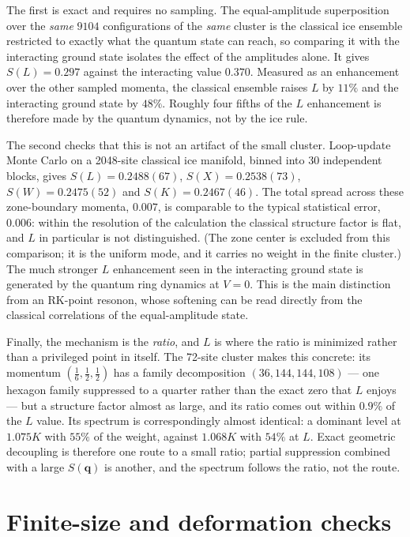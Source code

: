 \documentclass[aps,prl,twocolumn,amsmath,amssymb,superscriptaddress,
longbibliography,floatfix]{revtex4-2}
\newcommand{\bq}{\bm q}
\begin{document}
The first is exact and requires no sampling. The equal-amplitude
superposition over the \emph{same} $9104$ configurations of the
\emph{same} cluster is the classical ice ensemble restricted to
exactly what the quantum state can reach, so comparing it with the
interacting ground state isolates the effect of the amplitudes alone.
It gives $S(L)=0.297$ against the interacting value $0.370$. Measured
as an enhancement over the other sampled momenta, the classical
ensemble raises $L$ by $11\%$ and the interacting ground state by
$48\%$. Roughly four fifths of the $L$ enhancement is therefore made
by the quantum dynamics, not by the ice rule.

The second checks that this is not an artifact of the small cluster.
Loop-update Monte Carlo on a 2048-site classical ice manifold, binned
into $30$ independent blocks, gives
$S(L)=0.2488(67)$, $S(X)=0.2538(73)$, $S(W)=0.2475(52)$ and
$S(K)=0.2467(46)$. The total spread across these zone-boundary
momenta, $0.007$, is comparable to the typical statistical error,
$0.006$: within the resolution of the calculation the classical
structure factor is flat, and $L$ in particular is not distinguished.
(The zone center is excluded from this comparison; it is the uniform
mode, and it carries no weight in the finite cluster.) The much
stronger $L$ enhancement seen in the interacting ground state is
generated by the quantum ring dynamics at $V=0$. This is the main
distinction from an RK-point resonon, whose softening can be read
directly from the classical correlations of the equal-amplitude state.

Finally, the mechanism is the \emph{ratio}, and $L$ is where the ratio
is minimized rather than a privileged point in itself. The 72-site
cluster makes this concrete: its momentum $(\frac16,\frac12,\frac12)$
has a family decomposition $(36,144,144,108)$ --- one hexagon family
suppressed to a quarter rather than the exact zero that $L$ enjoys ---
but a structure factor almost as large, and its ratio comes out within
$0.9\%$ of the $L$ value. Its spectrum is correspondingly almost
identical: a dominant level at $1.075K$ with $55\%$ of the weight,
against $1.068K$ with $54\%$ at $L$. Exact geometric decoupling is
therefore one route to a small ratio; partial suppression combined
with a large $S(\bq)$ is another, and the spectrum follows the ratio,
not the route.


\section{Finite-size and deformation checks}
\label{sm:finite}
\end{document}
